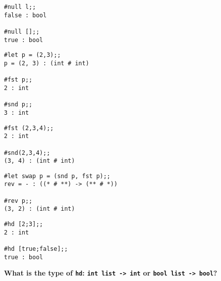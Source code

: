 \begin{session}\begin{verbatim}
#null l;;
false : bool

#null [];;
true : bool
\end{verbatim}\end{session}



\begin{session}\begin{verbatim}
#let p = (2,3);;
p = (2, 3) : (int # int)

#fst p;;
2 : int

#snd p;;
3 : int
\end{verbatim}\end{session}


\begin{session}\begin{verbatim}
#fst (2,3,4);;
2 : int

#snd(2,3,4);;
(3, 4) : (int # int)
\end{verbatim}\end{session}

\begin{session}\begin{verbatim}
#let swap p = (snd p, fst p);;
rev = - : ((* # **) -> (** # *))

#rev p;;
(3, 2) : (int # int)
\end{verbatim}\end{session}




\begin{session}\begin{verbatim}
#hd [2;3];;
2 : int

#hd [true;false];;
true : bool
\end{verbatim}\end{session}
\vskip1mm
\bpindent\LARGE\bf
What is the type of {\tt hd}:
\epindent
\vskip7mm
\bspindent\LARGE
\bf \verb!int list -> int! or  \verb!bool list -> bool!?
\espindent
\vskip5mm


